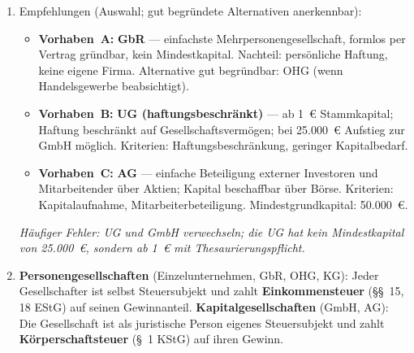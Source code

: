 \documentclass[11pt, a4paper]{article}
\begin{document}
\begin{enumerate}[label=(\alph*)]
  \item Empfehlungen (Auswahl; gut begründete Alternativen anerkennbar):
  \begin{itemize}
    \item \textbf{Vorhaben~A:} \textbf{GbR} --- einfachste Mehrpersonengesellschaft, formlos per
    Vertrag gründbar, kein Mindestkapital. Nachteil: persönliche Haftung, keine eigene Firma.
    Alternative gut begründbar: OHG (wenn Handelsgewerbe beabsichtigt).
    \item \textbf{Vorhaben~B:} \textbf{UG (haftungsbeschränkt)} --- ab 1~€ Stammkapital; Haftung
    beschränkt auf Gesellschaftsvermögen; bei 25.000~€ Aufstieg zur GmbH möglich. Kriterien:
    Haftungsbeschränkung, geringer Kapitalbedarf.
    \item \textbf{Vorhaben~C:} \textbf{AG} --- einfache Beteiligung externer Investoren und
    Mitarbeitender über Aktien; Kapital beschaffbar über Börse. Kriterien: Kapitalaufnahme,
    Mitarbeiterbeteiligung. Mindestgrundkapital: 50.000~€.
  \end{itemize}
  \textit{Häufiger Fehler: UG und GmbH verwechseln; die UG hat kein Mindestkapital von 25.000~€,
  sondern ab 1~€ mit Thesaurierungspflicht.}

  \item \textbf{Personengesellschaften} (Einzelunternehmen, GbR, OHG, KG): Jeder Gesellschafter
  ist selbst Steuersubjekt und zahlt \textbf{Einkommensteuer} (§§~15, 18 EStG) auf seinen
  Gewinnanteil. \textbf{Kapitalgesellschaften} (GmbH, AG): Die Gesellschaft ist als juristische
  Person eigenes Steuersubjekt und zahlt \textbf{Körperschaftsteuer} (§~1 KStG) auf ihren Gewinn.
\end{enumerate}
\end{document}
